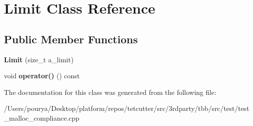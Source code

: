 \hypertarget{classLimit}{}\section{Limit Class Reference}
\label{classLimit}
\subsection*{Public Member Functions}
\begin{DoxyCompactItemize}
\item 
\hypertarget{classLimit_a393bae06691bcefd624cff37c54db6d4}{}{\bfseries Limit} (size\+\_\+t a\+\_\+limit)\label{classLimit_a393bae06691bcefd624cff37c54db6d4}

\item 
\hypertarget{classLimit_a2a4ff6469cd13e9d2e476a0a941bdaac}{}void {\bfseries operator()} () const \label{classLimit_a2a4ff6469cd13e9d2e476a0a941bdaac}

\end{DoxyCompactItemize}


The documentation for this class was generated from the following file\+:\begin{DoxyCompactItemize}
\item 
/\+Users/pourya/\+Desktop/platform/repos/tetcutter/src/3rdparty/tbb/src/test/test\+\_\+malloc\+\_\+compliance.\+cpp\end{DoxyCompactItemize}
